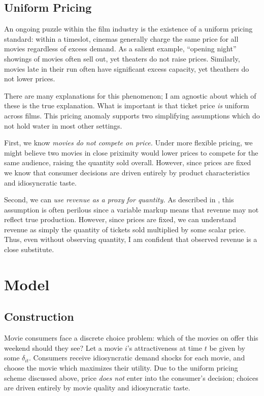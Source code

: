 \documentclass{article}
\begin{document}
\subsection{Uniform Pricing}

An ongoing puzzle within the film industry is the existence of a uniform pricing standard: within a timeslot, cinemas generally charge the same price for all movies regardless of excess demand. As a salient example, ``opening night'' showings of movies often sell out, yet theaters do not raise prices. Similarly, movies late in their run often have significant excess capacity, yet theathers do not lower prices.

There are many explanations for this phenomenon; I am agnostic about which of these is the true explanation. What is important is that ticket price \emph{is} uniform across films. This pricing anomaly supports two simplifying assumptions which do not hold water in most other settings.

First, we know \emph{movies do not compete on price.} Under more flexible pricing, we might believe two movies in close priximity would lower prices to compete for the same audience, raising the quantity sold overall. However, since prices are fixed we know that consumer decisions are driven entirely by product characteristics and idiosyncratic taste.

Second, we can \emph{use revenue as a proxy for quantity.} As described in \textcite{bond2021JME}, this assumption is often perilous since a variable markup means that revenue may not reflect true production. However, since prices are fixed, we can understand revenue as simply the quantity of tickets sold multiplied by some scalar price. Thus, even without observing quantity, I am confident that observed revenue is a close substitute. 


\section{Model}

\subsection{Construction}

Movie consumers face a discrete choice problem: which of the movies on offer this weekend should they see? Let a movie $i$'s attractiveness at time $t$ be given by some $\delta_{it}$. Consumers receive idiosyncratic demand shocks for each movie, and choose the movie which maximizes their utility. Due to the uniform pricing scheme discussed above, price \emph{does not} enter into the consumer's decision; choices are driven entirely by movie quality and idiosyncratic taste.
\end{document}
